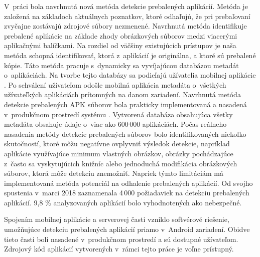 V~práci bola navrhnutá nová metóda detekcie prebalených aplikácií. Metóda je založená na základoch aktuálnych poznatkov, ktoré odhaľujú, že pri prebaľovaní zvyčajne zostávajú zdrojové súbory nezmenené. Navrhnutá metóda identifikuje prebalené aplikácie na základe zhody obrázkových súborov medzi viacerými aplikačnými balíčkami. Na rozdiel od väčšiny existujúcich prístupov je naša metóda schopná identifikovať, ktorá z~aplikácií je originálna, a ktoré sú prebalené kópie. Táto metóda pracuje s~dynamicky sa vyvíjajúcou databázou metadát o~aplikáciách. Na tvorbe tejto databázy sa podieľajú užívatelia mobilnej aplikácie . Po schválení užívateľom odošle mobilná aplikácia metadáta o~všetkých užívateľkých aplikáciách prítomných na danom zariadení. Navrhnutá metóda detekcie prebalených APK súborov bola prakticky implementovaná a nasadená v~produkčnom prostredí systému .
Vytvorená databáza obsahujúca všetky metadáta obsahuje údaje o~viac ako 600\,000 aplikáciách. Počas reálneho nasadenia metódy detekcie prebalených súborov bolo identifikovaných niekoľko skutočností, ktoré môžu negatívne ovplyvniť výsledok detekcie, napríklad aplikácie využívajúce minimum vlastných obrázkov, obrázky pochádzajúce z~často sa vyskytujúcich knižníc alebo jednoduchá modifikácia obrázkových súborov, ktorá môže detekciu znemožniť. Napriek týmto limitáciám má implementovaná metóda potenciál na odhalenie prebalených aplikácií. Od svojho spustenia v~marci 2018 zaznamenala 4\,000 požiadaviek na detekciu prebalených aplikácií. 9,8 \% analyzovaných aplikácií bolo vyhodnotených ako nebezpečné.

Spojením mobilnej aplikácie a serverovej časti vzniklo softvérové riešenie, umožňujúce detekciu prebalených aplikácií priamo v~Android zariadení. Obidve tieto časti boli nasadené v~produkčnom prostredí a sú dostupné užívateľom. Zdrojový kód aplikácií vytvorených v~rámci tejto práce je voľne prístupný.
